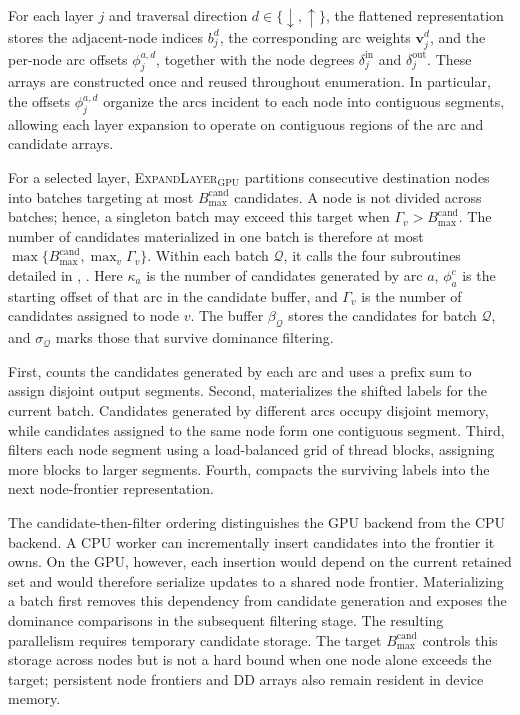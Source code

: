\documentclass[letterpaper]{article}
\begin{document}
For each layer $j$ and traversal direction $d\in\{\downarrow,\uparrow\}$, the flattened representation stores the adjacent-node indices $b_j^d$, the corresponding arc weights $\mathbf{v}_j^d$, and the per-node arc offsets $\phi_j^{a,d}$, together with the node degrees $\delta_j^{\mathrm{in}}$ and $\delta_j^{\mathrm{out}}$. These arrays are constructed once and reused throughout enumeration. In particular, the offsets $\phi_j^{a,d}$ organize the arcs incident to each node into contiguous segments, allowing each layer expansion to operate on contiguous regions of the arc and candidate arrays.

For a selected layer, \textsc{ExpandLayer}$_{\mathrm{GPU}}$ partitions consecutive destination nodes into batches targeting at most $B_{\max}^{\mathrm{cand}}$ candidates. A node is not divided across batches; hence, a singleton batch may exceed this target when $\Gamma_v>B_{\max}^{\mathrm{cand}}$. The number of candidates materialized in one batch is therefore at most $\max\{B_{\max}^{\mathrm{cand}},\max_v\Gamma_v\}$. Within each batch $\mathcal{Q}$, it calls the four subroutines detailed in , . 
Here $\kappa_a$ is the number of candidates generated by arc $a$, $\phi^c_a$ is the starting offset of that arc in the candidate buffer, and $\Gamma_v$ is the number of candidates assigned to node $v$. The buffer $\beta_{\mathcal{Q}}$ stores the candidates for batch $\mathcal{Q}$, and $\sigma_{\mathcal{Q}}$ marks those that survive dominance filtering.

First,  counts the candidates generated by each arc and uses a prefix sum to assign disjoint output segments. Second,  materializes the shifted labels for the current batch. Candidates generated by different arcs occupy disjoint memory, while candidates assigned to the same node form one contiguous segment. Third,  filters each node segment using a load-balanced grid of thread blocks, assigning more blocks to larger segments. Fourth,  compacts the surviving labels into the next node-frontier representation.

The candidate-then-filter ordering distinguishes the GPU backend from the CPU backend. A CPU worker can incrementally insert candidates into the frontier it owns. On the GPU, however, each insertion would depend on the current retained set and would therefore serialize updates to a shared node frontier. Materializing a batch first removes this dependency from candidate generation and exposes the dominance comparisons in the subsequent filtering stage. The resulting parallelism requires temporary candidate storage. The target $B_{\max}^{\mathrm{cand}}$ controls this storage across nodes but is not a hard bound when one node alone exceeds the target; persistent node frontiers and DD arrays also remain resident in device memory.
\end{document}
